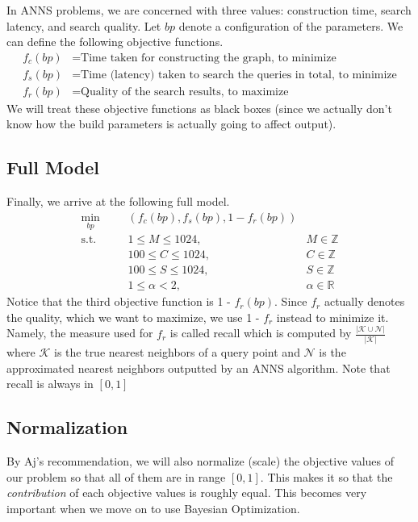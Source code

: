 In ANNS problems, we are concerned with three values: construction time, search latency, and search quality. Let \(bp\) denote a configuration of the parameters. We can define the following objective functions.
\[
\begin{aligned}
    f_c(bp) &= \text{Time taken for constructing the graph, to minimize} \\
    f_s(bp) &= \text{Time (latency) taken to search the queries in total, to minimize} \\
    f_r(bp) &= \text{Quality of the search results, to maximize}
\end{aligned}
\]
We will treat these objective functions as black boxes (since we actually don't know how the build parameters is actually going to affect output).

\subsection{Full Model}

Finally, we arrive at the following full model.
\[
\begin{aligned}
    \min_{bp} &\left(f_c(bp), f_s(bp), 1 - f_r(bp)\right) \\
    \text{s.t.} \qquad
        &1 \leq M \leq 1024, & M \in \mathbb{Z} \\
        &100 \leq C \leq 1024, & C \in \mathbb{Z} \\
        &100 \leq S \leq 1024, & S \in \mathbb{Z} \\
        &1 \leq \alpha < 2, &\alpha \in \mathbb{R}
\end{aligned}
\]
Notice that the third objective function is 1 - \(f_r(bp)\). Since \(f_r\) actually denotes the quality, which we want to maximize, we use 1 - \(f_r\) instead to minimize it. Namely, the measure used for \(f_r\) is called recall which is computed by \(\frac{|\mathcal{K} \cup \mathcal{N}|}{|\mathcal{K}|}\) where \(\mathcal{K}\) is the true nearest neighbors of a query point and \(\mathcal{N}\) is the approximated nearest neighbors outputted by an ANNS algorithm. Note that recall is always in \([0, 1]\)

\subsection{Normalization}

By Aj's recommendation, we will also normalize (scale) the objective values of our problem so that all of them are in range \([0, 1]\). This makes it so that the \textit{contribution} of each objective values is roughly equal. This becomes very important when we move on to use Bayesian Optimization.

